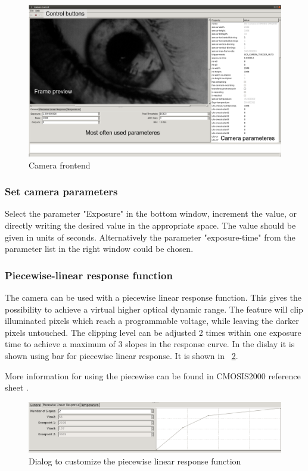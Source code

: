 \begin{figure}[h] 
\includegraphics[width=\textwidth]{images/ufo_gui2.png}
\caption{\label{camera-gui} Camera frontend}
\end{figure}


\subsubsection{Set camera parameters}

Select the parameter "Exposure" in the bottom window, increment the value, or directly writing the desired value in the appropriate space. The value should be given in units of seconds. Alternatively the parameter "exposure-time" from the  parameter list in the right window could be chosen.

\subsubsection{Piecewise-linear response function}

The camera can be used with a piecewise linear response function. This gives the possibility to achieve a virtual higher optical dynamic range. The feature will clip illuminated pixels which reach a programmable voltage, while leaving the darker pixels untouched. The clipping level can be adjusted 2 times within one exposure time to achieve a maximum of 3 slopes in the response curve. In the dislay it is shown using bar for piecewise linear response. It is shown in  \figurename~\ref{ufo_gui_piecewise_bar}. 

More information for using the piecewise can be found in CMOSIS2000 reference sheet \cite{CMOSIS:CMV2000}.

\begin{figure}[h]
\centering
\includegraphics[width=1\textwidth]{images/ufo_gui_piecewise_bar.png}
\caption{\label{ufo_gui_piecewise_bar} Dialog to customize the piecewise linear response function}
\end{figure}

